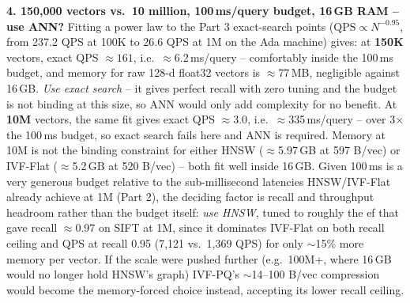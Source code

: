 \documentclass[10pt]{article}
\begin{document}
\textbf{4. 150{,}000 vectors vs.\ 10 million, 100\,ms/query budget, 16\,GB RAM -- use ANN?}
Fitting a power law to the Part 3 exact-search points ($\text{QPS}\propto N^{-0.95}$, from
237.2 QPS at 100K to 26.6 QPS at 1M on the Ada machine) gives: at \textbf{150K} vectors, exact
QPS $\approx 161$, i.e.\ $\approx$6.2\,ms/query -- comfortably inside the 100\,ms budget, and
memory for raw 128-d float32 vectors is $\approx$77\,MB, negligible against 16\,GB. \emph{Use
exact search} -- it gives perfect recall with zero tuning and the budget is not binding at this
size, so ANN would only add complexity for no benefit. At \textbf{10M} vectors, the same fit
gives exact QPS $\approx 3.0$, i.e.\ $\approx$335\,ms/query -- over 3$\times$ the 100\,ms budget,
so exact search fails here and ANN is required. Memory at 10M is not the binding constraint for
either HNSW ($\approx$5.97\,GB at 597 B/vec) or IVF-Flat ($\approx$5.2\,GB at 520 B/vec) --
both fit well inside 16\,GB. Given 100\,ms is a very generous budget relative to the
sub-millisecond latencies HNSW/IVF-Flat already achieve at 1M (Part 2), the deciding factor is
recall and throughput headroom rather than the budget itself: \emph{use HNSW}, tuned to roughly
the ef that gave recall $\approx$0.97 on SIFT at 1M, since it dominates IVF-Flat on both recall
ceiling and QPS at recall 0.95 (7{,}121 vs.\ 1{,}369 QPS) for only $\sim$15\% more memory per
vector. If the scale were pushed further (e.g.\ 100M+, where 16\,GB would no longer hold HNSW's
graph) IVF-PQ's $\sim$14--100 B/vec compression would become the memory-forced choice instead,
accepting its lower recall ceiling.
\end{document}
